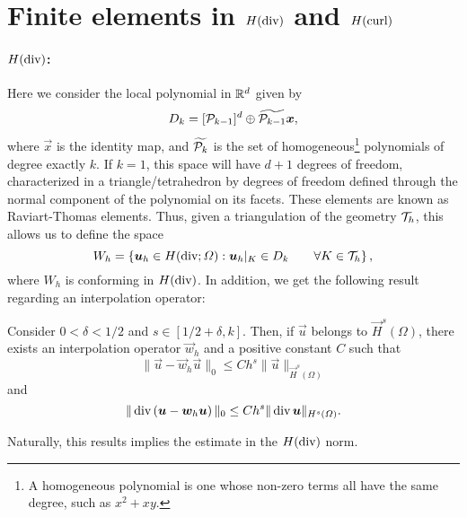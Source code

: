 \section{Finite elements in $H(\dive)$ and $H(\curl)$}
\paragraph{$H(\dive)$:} Here we consider the local polynomial in $\R^d$ given by
    \begin{equation*}
D_k = [\P_{k-1}]^d \oplus \widetilde{\P_{k-1}} \vec x,
\end{equation*}
where $\vec x$ is the identity map, and $\widetilde{\P_k}$ is the set of homogeneous\footnote{A homogeneous polynomial is one whose non-zero terms all have the same degree, such as $x^2 + xy$.} polynomials of degree exactly $k$. If $k=1$, this space will have $d+1$ degrees of freedom, characterized in a triangle/tetrahedron by degrees of freedom defined through the normal component of the polynomial on its facets. These elements are known as Raviart-Thomas elements. Thus, given a triangulation of the geometry $\T_h$, this allows us to define the space
    \begin{equation*}
W_h = \left\{ \vec u_h \in H(\dive; \Omega):  \vec u_h|_K \in D_k \qquad\forall K \in \T_h \right\},
\end{equation*}
where $W_h$ is conforming in $H(\dive)$. In addition, we get the following result regarding an interpolation operator: 
    \begin{theorem}
        Consider $0<\delta<1/2$ and $s\in [1/2+\delta, k]$. Then, if $\vec u$ belongs to $\vec H^s(\Omega)$, there exists an interpolation operator $\vec w_h$ and a positive constant $C$ such that
            \begin{equation*}
\|\vec u - \vec w_h \vec u\|_0 \leq C h^s \| \vec u \|_{\vec H^s(\Omega)}
\end{equation*}
        and 
            \begin{equation*}
\|\dive\left(\vec u - \vec w_h \vec u\right)\|_0 \leq C h^s \| \dive \vec u \|_{H^s(\Omega)}.
\end{equation*}
    \end{theorem}
Naturally, this results implies the estimate in the $H(\dive)$ norm. 
